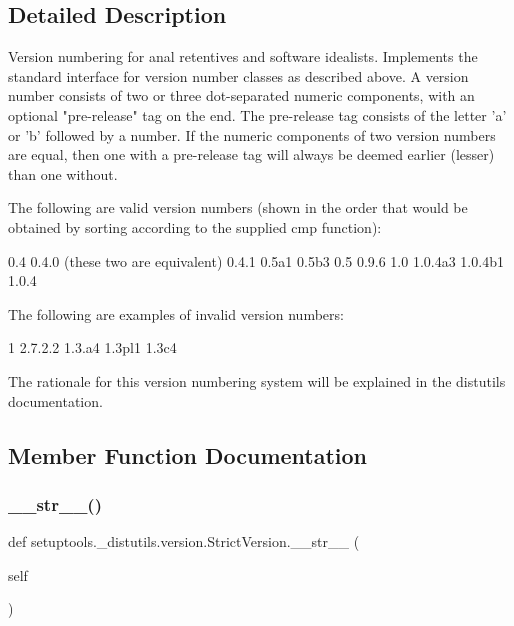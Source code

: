 \subsection{Detailed Description}
\begin{DoxyVerb}Version numbering for anal retentives and software idealists.
Implements the standard interface for version number classes as
described above.  A version number consists of two or three
dot-separated numeric components, with an optional "pre-release" tag
on the end.  The pre-release tag consists of the letter 'a' or 'b'
followed by a number.  If the numeric components of two version
numbers are equal, then one with a pre-release tag will always
be deemed earlier (lesser) than one without.

The following are valid version numbers (shown in the order that
would be obtained by sorting according to the supplied cmp function):

    0.4       0.4.0  (these two are equivalent)
    0.4.1
    0.5a1
    0.5b3
    0.5
    0.9.6
    1.0
    1.0.4a3
    1.0.4b1
    1.0.4

The following are examples of invalid version numbers:

    1
    2.7.2.2
    1.3.a4
    1.3pl1
    1.3c4

The rationale for this version numbering system will be explained
in the distutils documentation.
\end{DoxyVerb}
 

\subsection{Member Function Documentation}
\mbox{\label{classsetuptools_1_1__distutils_1_1version_1_1StrictVersion_a9d0e48fb3db8e0bdb6635bffd8a63a9b}} 
\subsubsection{\texorpdfstring{\+\_\+\+\_\+str\+\_\+\+\_\+()}{\_\_str\_\_()}}
{\footnotesize\ttfamily def setuptools.\+\_\+distutils.\+version.\+Strict\+Version.\+\_\+\+\_\+str\+\_\+\+\_\+ (\begin{DoxyParamCaption}\item[{}]{self }\end{DoxyParamCaption})}

